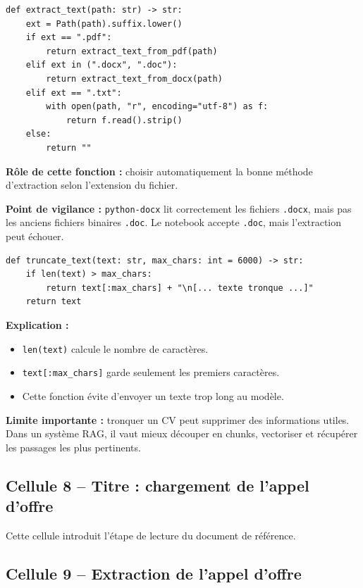 \documentclass[12pt,a4paper]{article}
\begin{document}
\begin{lstlisting}[style=pythonstyle]
def extract_text(path: str) -> str:
    ext = Path(path).suffix.lower()
    if ext == ".pdf":
        return extract_text_from_pdf(path)
    elif ext in (".docx", ".doc"):
        return extract_text_from_docx(path)
    elif ext == ".txt":
        with open(path, "r", encoding="utf-8") as f:
            return f.read().strip()
    else:
        return ""
\end{lstlisting}

\textbf{Rôle de cette fonction :} choisir automatiquement la bonne méthode d'extraction selon l'extension du fichier.

\textbf{Point de vigilance :} \texttt{python-docx} lit correctement les fichiers \texttt{.docx}, mais pas les anciens fichiers binaires \texttt{.doc}. Le notebook accepte \texttt{.doc}, mais l'extraction peut échouer.

\begin{lstlisting}[style=pythonstyle]
def truncate_text(text: str, max_chars: int = 6000) -> str:
    if len(text) > max_chars:
        return text[:max_chars] + "\n[... texte tronque ...]"
    return text
\end{lstlisting}

\textbf{Explication :}
\begin{itemize}
  \item \texttt{len(text)} calcule le nombre de caractères.
  \item \texttt{text[:max\_chars]} garde seulement les premiers caractères.
  \item Cette fonction évite d'envoyer un texte trop long au modèle.
\end{itemize}

\textbf{Limite importante :} tronquer un CV peut supprimer des informations utiles. Dans un système RAG, il vaut mieux découper en chunks, vectoriser et récupérer les passages les plus pertinents.

\subsection{Cellule 8 -- Titre : chargement de l'appel d'offre}

Cette cellule introduit l'étape de lecture du document de référence.

\subsection{Cellule 9 -- Extraction de l'appel d'offre}
\end{document}
